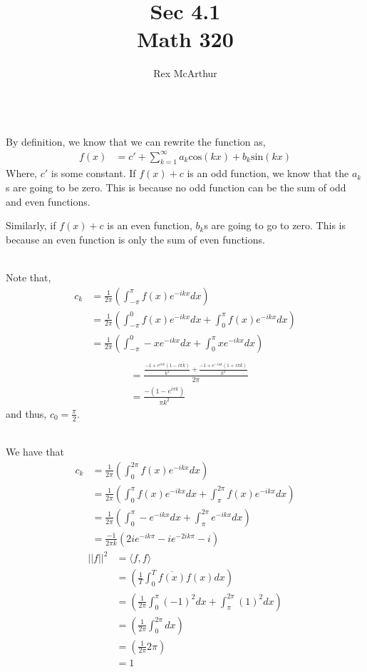 \documentclass[letterpaper,12pt]{article}
\title{Sec 4.1 \\Math 320}
\author{Rex McArthur}
\theoremstyle{definition}
\begin{document}
\maketitle

\\

By definition, we know that we can rewrite the function as,
\begin{align*}
f(x) &=  c' + \sum^{\infty}_{k=1} a_k \text{cos}(kx) + b_k \text{sin} (kx)
\end{align*}
Where, $c'$ is some constant.
If $f(x) + c$ is an odd function, we know that the $a_k$s are going to be zero. This is because no odd function can be the sum of odd and even functions.

Similarly, if $f(x) + c$ is an even function, $b_k$s are going to go to zero. This is because an even function is only the sum of even functions.

\\
Note that, 
\begin{align*}
    c_k &= \frac{1}{2\pi} \left( \int^{\pi}_{-\pi} f(x)e^{-ikx}  dx \right)\\
    &= \frac{1}{2\pi} \left( \int^{0}_{-\pi} f(x)e^{-ikx}  dx + \int^{\pi}_{0} f(x)e^{-ikx}  dx \right)\\
    &= \frac{1}{2\pi} \left( \int^{0}_{-\pi} -x e^{-ikx}  dx + \int^{\pi}_{0} x e^{-ikx}  dx \right)\\
\end{align*}
\begin{align*}
    &= \frac{\frac{-1+e^{i \pi k} (1-i \pi k)}{k^2}+\frac{-1+e^{-i \pi k} (1+i \pi k)}{k^2}}{2 \pi}\\
    &= \frac{-(1 - e^{i \pi k})}{\pi k^2}
\end{align*}
and thus, $c_0 = \frac{\pi}{2}$. 

\\
We have that
\begin{align*}
    c_k &= \frac{1}{2\pi} \left( \int^{2\pi}_{0} f(x)e^{-ikx}  dx \right)\\
    &= \frac{1}{2\pi} \left( \int^{\pi}_{0} f(x)e^{-ikx}  dx + \int^{2\pi}_{\pi} f(x)e^{-ikx}  dx  \right)\\
    &= \frac{1}{2\pi} \left( \int^{\pi}_{0} -e^{-ikx}  dx + \int^{2\pi}_{\pi} e^{-ikx}  dx  \right)\\
    &= \frac{-1}{2 \pi k} (2ie^{-ik \pi} - ie^{-2ik \pi} - i)
\end{align*}
\begin{align*}
    ||f||^2 &= \langle f, f \rangle \\
    &= \left( \frac{1}{T} \int^{T}_{0} \overline {f(x)} f(x) dx \right)  \\
    &= \left( \frac{1}{2 \pi} \int^{\pi}_{0} (-1)^2 dx + \int^{2\pi}_{\pi} (1)^2 dx\right)  \\
    &= \left( \frac{1}{2 \pi} \int^{2\pi}_{0}dx\right)  \\
    &= \left( \frac{1}{2 \pi} 2\pi\right)  \\
    &= 1 
\end{align*}
\end{document}

